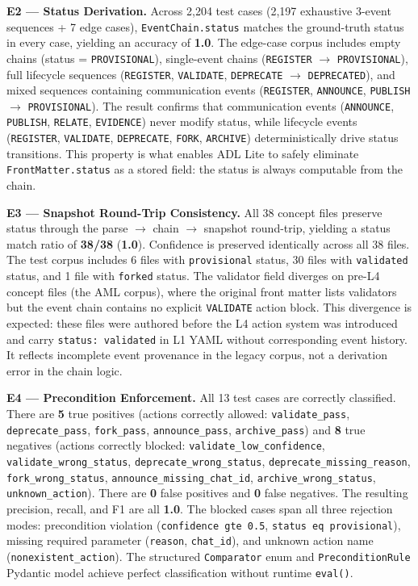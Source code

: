 \textbf{E2 --- Status Derivation.} Across 2,204 test cases (2,197 exhaustive 3-event sequences + 7 edge cases), \texttt{EventChain.status} matches the ground-truth status in every case, yielding an accuracy of \textbf{1.0}. The edge-case corpus includes empty chains (status = \texttt{PROVISIONAL}), single-event chains (\texttt{REGISTER} \(\rightarrow\) \texttt{PROVISIONAL}), full lifecycle sequences (\texttt{REGISTER}, \texttt{VALIDATE}, \texttt{DEPRECATE} \(\rightarrow\) \texttt{DEPRECATED}), and mixed sequences containing communication events (\texttt{REGISTER}, \texttt{ANNOUNCE}, \texttt{PUBLISH} \(\rightarrow\) \texttt{PROVISIONAL}). The result confirms that communication events (\texttt{ANNOUNCE}, \texttt{PUBLISH}, \texttt{RELATE}, \texttt{EVIDENCE}) never modify status, while lifecycle events (\texttt{REGISTER}, \texttt{VALIDATE}, \texttt{DEPRECATE}, \texttt{FORK}, \texttt{ARCHIVE}) deterministically drive status transitions. This property is what enables ADL Lite to safely eliminate \texttt{FrontMatter.status} as a stored field: the status is always computable from the chain.

\textbf{E3 --- Snapshot Round-Trip Consistency.} All 38 concept files preserve status through the parse \(\rightarrow\) chain \(\rightarrow\) snapshot round-trip, yielding a status match ratio of \textbf{38/38} (\textbf{1.0}). Confidence is preserved identically across all 38 files. The test corpus includes 6 files with \texttt{provisional} status, 30 files with \texttt{validated} status, and 1 file with \texttt{forked} status. The validator field diverges on pre-L4 concept files (the AML corpus), where the original front matter lists validators but the event chain contains no explicit \texttt{VALIDATE} action block. This divergence is expected: these files were authored before the L4 action system was introduced and carry \texttt{status:\ validated} in L1 YAML without corresponding event history. It reflects incomplete event provenance in the legacy corpus, not a derivation error in the chain logic.

\textbf{E4 --- Precondition Enforcement.} All 13 test cases are correctly classified. There are \textbf{5} true positives (actions correctly allowed: \texttt{validate\_pass}, \texttt{deprecate\_pass}, \texttt{fork\_pass}, \texttt{announce\_pass}, \texttt{archive\_pass}) and \textbf{8} true negatives (actions correctly blocked: \texttt{validate\_low\_confidence}, \texttt{validate\_wrong\_status}, \texttt{deprecate\_wrong\_status}, \texttt{deprecate\_missing\_reason}, \texttt{fork\_wrong\_status}, \texttt{announce\_missing\_chat\_id}, \texttt{archive\_wrong\_status}, \texttt{unknown\_action}). There are \textbf{0} false positives and \textbf{0} false negatives. The resulting precision, recall, and F1 are all \textbf{1.0}. The blocked cases span all three rejection modes: precondition violation (\texttt{confidence\ gte\ 0.5}, \texttt{status\ eq\ provisional}), missing required parameter (\texttt{reason}, \texttt{chat\_id}), and unknown action name (\texttt{nonexistent\_action}). The structured \texttt{Comparator} enum and \texttt{PreconditionRule} Pydantic model achieve perfect classification without runtime \texttt{eval()}.

